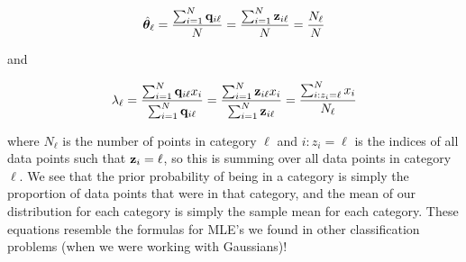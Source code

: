 \documentclass[submit]{harvardml}
\begin{document}
\begin{enumerate}
$$ \hat{\boldsymbol{\theta}}_\ell =  \frac{\sum_{i=1}^N \mathbf{q}_{i\ell}}{N} = \frac{\sum_{i=1}^N \mathbf{z}_{i\ell}}{N} = \frac{N_\ell}{N}$$

and 

$$\lambda_\ell = \frac{\sum_{i=1}^N \mathbf{q}_{i\ell}x_i}{\sum_{i=1}^N \mathbf{q}_{i\ell}} = \frac{\sum_{i=1}^N \mathbf{z}_{i\ell}x_i}{\sum_{i=1}^N \mathbf{z}_{i\ell}} = \frac{\sum_{i: z_i = \ell}^N x_i}{N_\ell}$$

where $N_\ell$ is the number of points in category $\ell$ and $i: z_i = \ell$ is the indices of all data points such that $\bold z_i = \ell$, so this is summing over all data points in category $\ell$. We see that the prior probability of being in a category is simply the proportion of data points that were in that category, and the mean of our distribution for each category is simply the sample mean for each category. These equations resemble the formulas for MLE's we found in other classification problems (when we were working with Gaussians)!

\end{enumerate}


\newpage
\end{document}
